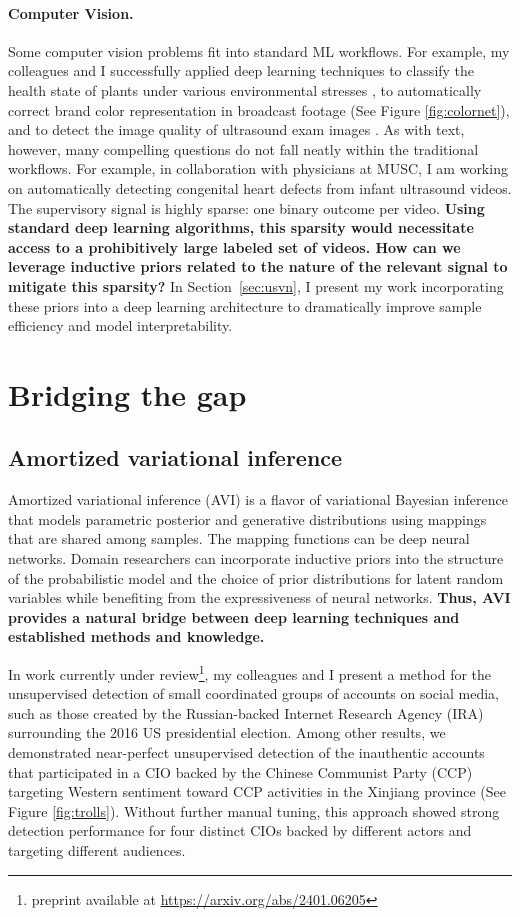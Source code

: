\documentclass{tufte-handout}
\begin{document}
\paragraph{Computer Vision.} Some computer vision problems fit into standard ML workflows. For example, my colleagues and I successfully applied deep learning techniques to classify the health state of plants under various environmental stresses \citep{freeman2019watson}, to automatically correct brand color representation in broadcast footage \citep{mayes_2021_smpte} (See Figure \ref{fig:colornet}), and to detect the image quality of ultrasound exam images \citep{taye2022deep}. As with text, however, many compelling questions do not fall neatly within the traditional workflows. For example, in collaboration with physicians at MUSC, I am working on automatically detecting congenital heart defects from infant ultrasound videos. The supervisory signal is highly sparse: one binary outcome per video. {\bf Using standard deep learning algorithms, this sparsity would necessitate access to a prohibitively large labeled set of videos. How can we leverage inductive priors related to the nature of the relevant signal to mitigate this sparsity?} In Section~\ref{sec:usvn}, I present my work incorporating these priors into a deep learning architecture to dramatically improve sample efficiency and model interpretability.

\section{Bridging the gap}\label{sec:current}

\subsection{Amortized variational inference}\label{sec:avi}
Amortized variational inference (AVI) is a flavor of variational Bayesian inference that models parametric posterior and generative distributions using mappings that are shared among samples. The mapping functions can be deep neural networks. Domain researchers can incorporate inductive priors into the structure of the probabilistic model and the choice of prior distributions for latent random variables while benefiting from the expressiveness of neural networks. {\bf Thus, AVI provides a natural bridge between deep learning techniques and established methods and knowledge.}

In work currently under review\thanks{preprint available at \url{https://arxiv.org/abs/2401.06205}}, my colleagues and I present a method for the unsupervised detection of small coordinated groups of accounts on social media, such as those created by the Russian-backed Internet Research Agency (IRA) surrounding the 2016 US presidential election. Among other results, we demonstrated near-perfect unsupervised detection of the inauthentic accounts that participated in a CIO backed by the Chinese Communist Party (CCP) targeting Western sentiment toward CCP activities in the Xinjiang province (See Figure \ref{fig:trolls}). Without further manual tuning, this approach showed strong detection performance for four distinct CIOs backed by different actors and targeting different audiences.
\end{document}
